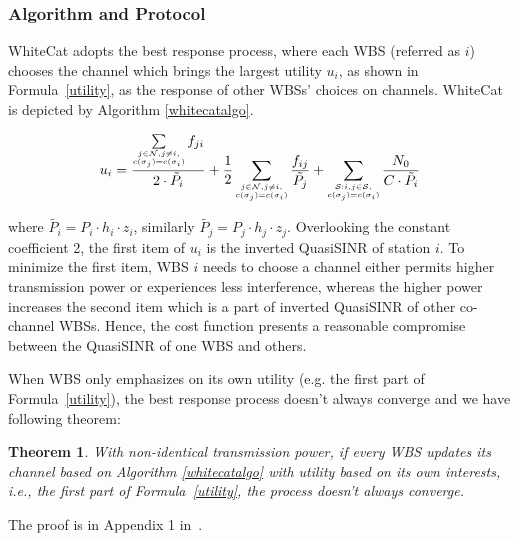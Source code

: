 \documentclass[times]{ettauth}
\newcommand{\ie}{i.e., }
\theoremstyle{mytheoremstyle}
\newtheorem{theorem}{Theorem}[section]
\theoremstyle{mytheoremstyle}
\theoremstyle{mytheoremstyle}
\begin{document}
\subsubsection{Algorithm and Protocol}

WhiteCat adopts the best response process, where each WBS (referred as $i$) chooses the channel which brings the largest utility $u_i$, as shown in Formula~\ref{utility}, as the response of other WBSs' choices on channels.
WhiteCat is depicted by Algorithm \ref{whitecatalgo}.

\begin{equation}
\label{utility}
u_i =\dfrac{\sum\limits_{\tiny\substack{j\in \mathcal{N}, j\ne i,\\ c(\sigma_j)=c(\sigma_i)}}f_{ji}}{2\cdot \tilde{P_i}} + \dfrac{1}{2}\sum_{\tiny\substack{j\in \mathcal{N}, j\ne i,\\ c(\sigma_j)=c(\sigma_i)}}\dfrac{f_{ij}}{\tilde{P_j}} + \sum_{\tiny\substack{\mathcal{S}:i,j\in \mathcal{S},\\ c(\sigma_j)=c(\sigma_i)}}\dfrac{N_0}{C\cdot \tilde{P_i}}\\
\end{equation}

where $\tilde{P_i} = P_i\cdot h_i\cdot z_i$, similarly $\tilde{P_j} = P_j\cdot h_j\cdot z_j$.
Overlooking the constant coefficient 2, the first item of $u_i$ is the inverted QuasiSINR of station $i$. 
To minimize the first item, WBS $i$ needs to choose a channel either permits higher transmission power or experiences less interference, whereas the higher power increases the second item which is a part of inverted QuasiSINR of other co-channel WBSs. 
Hence, the cost function presents a reasonable compromise between the QuasiSINR of one WBS and others.

When WBS only emphasizes on its own utility (e.g. the first part of Formula~\ref{utility}), the best response process doesn't always converge and we have following theorem:
\begin{theorem}
\label{noconvergence}
\emph{With non-identical transmission power, if every WBS updates its channel based on Algorithm \ref{whitecatalgo} with utility based on its own interests, \ie the first part of Formula~\ref{utility}, the process doesn't always converge.}
\end{theorem}
The proof is in Appendix 1 in~\cite{Li2012DistributedTS}.
\end{document}
